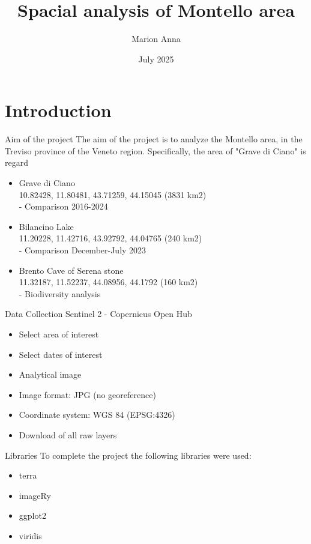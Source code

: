 \documentclass{beamer}
\title{Spacial analysis of Montello area}
\author{Marion Anna}
\date{July 2025}
\begin{document}
\maketitle


\section{Introduction}


\begin{frame}{Aim of the project}
The aim of the project is to analyze the Montello area, in the Treviso province  of the Veneto region. Specifically, the area of "Grave di Ciano" is regard \begin{itemize}
        \item Grave di Ciano \\
        10.82428, 11.80481, 43.71259, 44.15045 (3831 km2)\\
        - Comparison 2016-2024
        \bigskip
        \item Bilancino Lake \\
        11.20228, 11.42716, 43.92792, 44.04765 (240 km2)\\
        - Comparison December-July 2023
        \bigskip
        \item Brento Cave of Serena stone \\
        11.32187, 11.52237, 44.08956, 44.1792 (160 km2) \\
        - Biodiversity analysis
        \bigskip
    \end{itemize}
\end{frame}

\begin{frame}{Data Collection}
Sentinel 2 - Copernicus Open Hub
\begin{itemize}
    \item Select area of interest
    \item Select dates of interest
    \item Analytical image
    \item Image format: JPG (no georeference)
    \item Coordinate system: WGS 84 (EPSG:4326) 
    \item Download of all raw layers
\end{itemize}
\end{frame}

\begin{frame}{Libraries}
To complete the project the following libraries were used:
    \begin{itemize}
        \item terra
        \item imageRy
        \item ggplot2
        \item viridis
    \end{itemize}
\end{frame}
\end{document}
